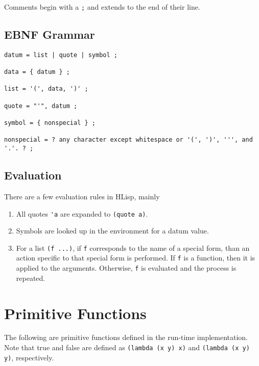 \documentclass[12pt]{article}
\begin{document}
Comments begin with a \verb!;! and extends to the end of their line.

\subsection{EBNF Grammar}

\begin{verbatim}
datum = list | quote | symbol ;

data = { datum } ;

list = '(', data, ')' ;

quote = "'", datum ;

symbol = { nonspecial } ;

nonspecial = ? any character except whitespace or '(', ')', ''', and '.'. ? ;
\end{verbatim}

\subsection{Evaluation}

There are a few evaluation rules in HLisp, mainly

\begin{enumerate}
\item All quotes \verb!'a! are expanded to \verb!(quote a)!.

\item Symbols are looked up in the environment for a datum value.

\item For a list \verb!(f ...)!, if \verb!f! corresponds to the name of a
  special form, than an action specific to that special form is performed. If
  \verb!f! is a function, then it is applied to the arguments. Otherwise,
  \verb!f! is evaluated and the process is repeated.
\end{enumerate}

\section{Primitive Functions}

The following are primitive functions defined in the run-time implementation.
Note that true and false are defined as \verb!(lambda (x y) x)! and
\verb!(lambda (x y) y)!, respectively.
\end{document}
